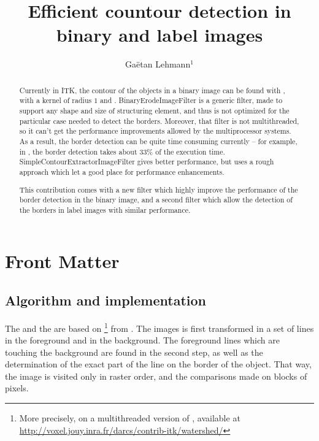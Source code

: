 \documentclass{InsightArticle}
\title{Efficient countour detection in binary and label images}
\author{Ga\"etan Lehmann{$^1$}}
\begin{document}
\maketitle

\ifhtml
\chapter*{Front Matter\label{front}}
\fi


\begin{abstract}
\noindent
Currently in ITK, the contour of the objects in a binary image can be found with , with a kernel of radius $1$ and . BinaryErodeImageFilter is a generic filter, made to support any shape and size of structuring element, and thus is not optimized for the particular case needed to detect the borders. Moreover, that filter is not multithreaded, so it can't get the performance improvements allowed by the multiprocessor systems. As a result, the border detection can be quite time consuming currently -- for example, in , the border detection takes about 33\% of the execution time. SimpleContourExtractorImageFilter gives better performance, but uses a rough approach which let a good place for performance enhancements.

This contribution comes with a new filter which highly improve the performance of the border detection in the binary image, and a second filter which allow the detection of the borders in label images with similar performance.

\end{abstract}


\section{Algorithm and implementation}

The  and the  are based on \footnote{More precisely, on a multithreaded version of , available at \\ \url{http://voxel.jouy.inra.fr/darcs/contrib-itk/watershed/}} from \cite{Beare:2006p42}. The images is first transformed in a set of lines in the foreground and in the background. The foreground lines which are touching the background are found in the second step, as well as the determination of the exact part of the line on the border of the object. That way, the image is visited only in raster order, and the comparisons made on blocks of pixels.
\end{document}
